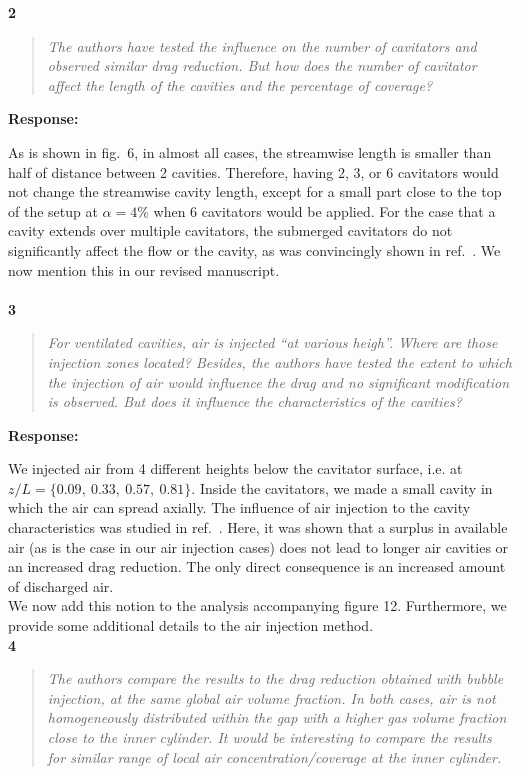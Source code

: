 \documentclass[10pt]{article}
\newcommand{\strong}[1]{\textbf{#1}}
\newcommand{\question}[1]{\begin{quote} \emph{#1}  \end{quote} }
\begin{document}
\noindent \strong{2}

\question{The authors have tested the influence on the number of cavitators and observed similar drag reduction. But how does the number of cavitator affect the length of the cavities and the percentage of coverage? }

\noindent \strong{Response:} 

\noindent  As is shown in fig.\ 6, in almost all cases, the streamwise length is smaller than half of distance between 2 cavities. Therefore, having 2, 3, or 6 cavitators would not change the streamwise cavity length, except for a small part close to the top of the setup at $\alpha=4\%$ when 6 cavitators would be applied. For the case that a cavity extends over multiple cavitators, the submerged cavitators do not significantly affect  the flow or the cavity, as was convincingly shown in ref.\ \cite{Zverkhovskyi2014}. 
We now mention this in our revised manuscript.\\
\\
\noindent \strong{3}

\question{For ventilated cavities, air is injected ``at various heigh''. Where are those injection zones located? Besides, the authors have tested the extent to which the injection of air would influence the drag and no significant modification is observed. But does it influence the characteristics of the cavities?}

\noindent \strong{Response:} 

\noindent We injected air from 4 different heights below the cavitator surface, i.e. at $z/L = \{0.09,~0.33,~0.57,~0.81\}$. Inside the cavitators, we made a small cavity in which the air can spread axially. The influence of air injection to the cavity characteristics was studied in  ref.\ \cite{Zverkhovskyi2014}. Here, it was shown that a surplus in available air (as is the case in our air injection cases) does not lead to longer air cavities or an increased drag reduction. The only direct consequence is an increased amount of discharged air. \\
We now add this notion to the analysis accompanying figure 12. Furthermore, we provide some additional details to the air injection method. 
\\

\noindent \strong{4}

\question{The authors compare the results to the drag reduction obtained with bubble injection, at the same global air volume fraction. In both cases, air is not homogeneously distributed within the gap with a higher gas volume fraction close to the inner cylinder. It would be interesting to compare the results for similar range of local air concentration/coverage at the inner cylinder. }
\end{document}
